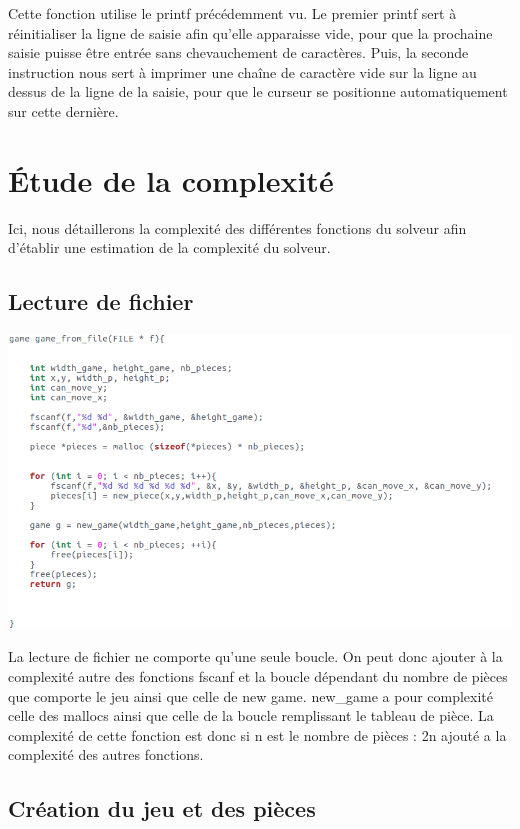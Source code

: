 \documentclass{article}
\begin{document}
Cette fonction utilise le printf précédemment vu. Le premier printf sert à réinitialiser la ligne de saisie afin qu'elle apparaisse vide, pour que la prochaine saisie puisse être entrée sans chevauchement de caractères. Puis, la seconde instruction nous sert à imprimer une chaîne de caractère vide sur la ligne au dessus de la ligne de la saisie, pour que le curseur se positionne automatiquement sur cette dernière.
\newpage

\section{Étude de la complexité}

Ici, nous détaillerons la complexité des différentes fonctions du solveur afin d'établir une estimation de la complexité du solveur.

\subsection{Lecture de fichier}

\begin{flushleft}
\includegraphics[scale=0.45]{gamefromfile.png}
\end{flushleft}

La lecture de fichier ne comporte qu'une seule boucle. On peut donc ajouter à la complexité autre des fonctions fscanf et la boucle dépendant du nombre de pièces que comporte le jeu ainsi que celle de new game.
new\_game a pour complexité celle des mallocs ainsi que celle de la boucle remplissant le tableau de pièce. La complexité de cette fonction est donc si n est le nombre de pièces : 2n ajouté a la complexité des autres fonctions.

\subsection{Création du jeu et des pièces}
\end{document}
